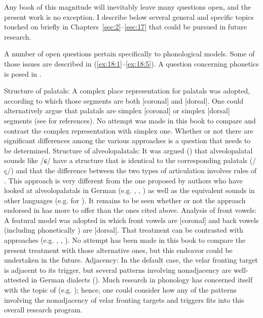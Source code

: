 Any book of this magnitude will inevitably leave many questions open, and the present work is no exception. I describe below several general and specific topics touched on briefly in Chapters~\ref{sec:2}--\ref{sec:17} that could be pursued in future research.

A number of open questions pertain specifically to phonological models. Some of those issues are described in (\ref{ex:18:1}--\ref{ex:18:5}). A question concerning phonetics is posed in .

\eanoraggedright%
    \label{ex:18:1}
          Structure of palatals: A complex place representation for palatals was adop\-ted, according to which those segments are both [coronal] and [dorsal]. One could alternatively argue that palatals are simplex [coronal] or simplex [dorsal] segments (see  for references). No attempt was made in this book to compare and contrast the complex representation with simplex one. Whether or not there are significant differences among the various approaches is a question that needs to be determined.
\ex%
    \label{ex:18:2}
          Structure of alveolopalatals: It was argued () that alveolopalatal sounds like /ɕ/ have a structure that is identical to the corresponding palatals (/ç/) and that the difference between the two types of articulation involves rules of . This approach is very different from the one proposed by authors who have looked at alveolopalatals in German (e.g. \citealt{Herrgen1986}, \citealt{Hall2014b}, \citealt{Féry2017}) as well as the equivalent sounds in other languages (e.g. \citealt{Rubach1984} for ). It remains to be seen whether or not the  approach endorsed in  has more to offer than the ones cited above.
\ex%
    \label{ex:18:3}
          Analysis of front vowels: A featural model was adopted in which front vowels are [coronal] and back vowels (including phonetically ) are [dorsal]. That treatment can be contrasted with approaches (e.g. \citealt{ChomskyHalle1968}, \citealt{Sagey1986}, \citealt{Kostakis2015}). No attempt has been made in this book to compare the present treatment with those alternative ones, but this endeavor could be undertaken in the future.
\ex%
    \label{ex:18:4}
          Adjacency: In the default case, the velar fronting target is adjacent to its trigger, but several patterns involving nonadjacency are well-attested in German dialects (). Much research in phonology has concerned itself with the topic of  (e.g. \citealt{Odden1994}); hence, one could consider how any of the patterns involving the nonadjacency of velar fronting targets and triggers fits into this overall research program.

